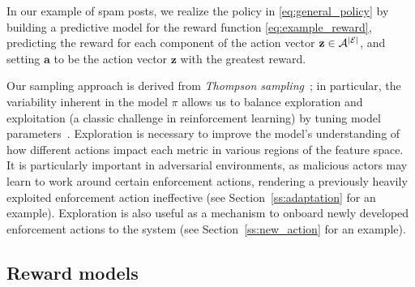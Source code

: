 In our example of spam posts, we realize the policy in \eqref{eq:general_policy} by building a predictive model for the reward function \eqref{eq:example_reward}, predicting the reward for each component of the action vector $\mathbf{z} \in \mathcal{A}^{\left|\mathcal{E}\right|}$, and setting $\mathbf{a}$ to be the action vector $\mathbf{z}$ with the greatest reward.

Our sampling approach is derived from {\em Thompson sampling}~\cite{thompson1933likelihood,agrawal2012analysis}; in particular, the variability inherent in the model $\pi$ allows us to balance exploration and exploitation (a classic challenge in reinforcement learning) by tuning model parameters~\cite{sutton2018reinforcement}.  Exploration is necessary to improve the model's understanding of how different actions impact each metric in various regions of the feature space. It is particularly important in adversarial environments, as malicious actors may learn to work around certain enforcement actions, rendering a previously heavily exploited enforcement action ineffective (see Section~\ref{ss:adaptation} for an example). Exploration is also useful as a mechanism to onboard newly developed enforcement actions to the system (see Section~\ref{ss:new_action} for an example). 

\subsection{Reward models}\label{sec:reward_prediction}

